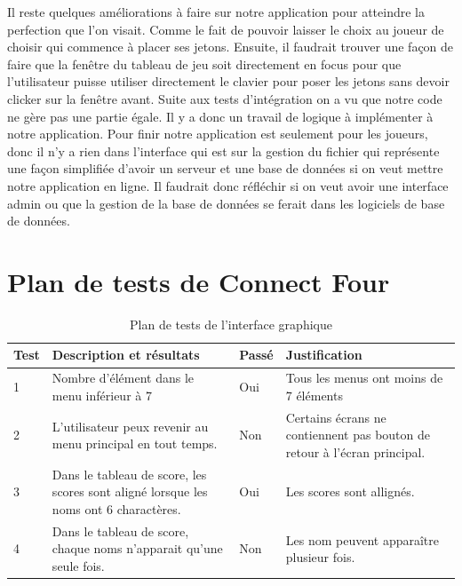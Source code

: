 Il reste quelques améliorations à faire sur notre application pour atteindre la perfection que l'on visait.
Comme le fait de pouvoir laisser le choix au joueur de choisir qui commence à placer ses jetons.
Ensuite, il faudrait trouver une façon de faire que la fenêtre du tableau de jeu soit directement en focus pour que l'utilisateur puisse utiliser directement le clavier pour poser les jetons sans devoir clicker sur la fenêtre avant.
Suite aux tests d'intégration on a vu que notre code ne gère pas une partie égale.
Il y a donc un travail de logique à implémenter à notre application.
Pour finir notre application est seulement pour les joueurs, donc il n'y a rien dans l'interface qui est sur la gestion du fichier qui représente une façon simplifiée d'avoir un serveur et une base de données si on veut mettre notre application en ligne.
Il faudrait donc réfléchir si on veut avoir une interface admin ou que la gestion de la base de données se ferait dans les logiciels de base de données.

\section{Plan de tests de Connect Four}

\begin{table}[H]
    \centering
    \caption{Plan de tests de l'interface graphique}
    \begin{tabular}{p{0.25in}p{2.5in}p{0.5in}p{2.5in}}
        \hline
        \bfseries Test & \bfseries Description et résultats & \bfseries Passé & \bfseries Justification \\
        \hline\hline
        1 & Nombre d'élément dans le menu inférieur à 7 & Oui & Tous les menus ont moins de 7 éléments \\
        2 & L'utilisateur peux revenir au menu principal en tout temps. & Non & Certains écrans ne contiennent pas bouton de retour à l'écran principal.\\
        3 & Dans le tableau de score, les scores sont aligné lorsque les noms ont 6 charactères. & Oui & Les scores sont allignés.\\
        4 & Dans le tableau de score, chaque noms n'apparait qu'une seule fois. & Non & Les nom peuvent apparaître plusieur fois.\\
        \hline
    \end{tabular}
\end{table}

